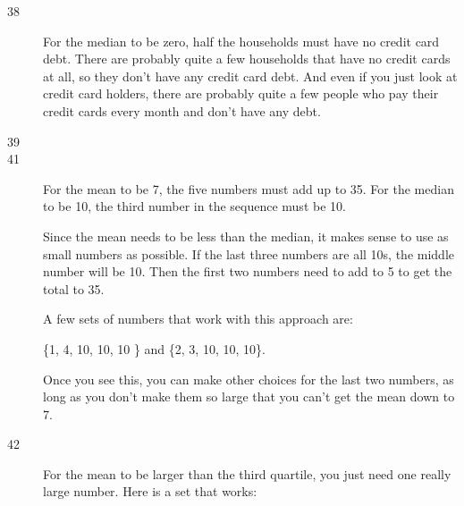 \documentclass{exam}
\begin{document}
\begin{description}
      \item[38]
        For the median to be zero, half the households must have no credit card
        debt.  There are probably quite a few households that have no credit
        cards at all, so they don't have any credit card debt.  And even if you
        just look at credit card holders, there are probably quite a few people
        who pay their credit cards every month and don't have any debt.

      \item[39]

      \item[41]
        For the mean to be 7, the five numbers must add up to 35.  For the
        median to be 10, the third number in the sequence must be 10.

        Since the mean needs to be less than the median, it makes sense to use
        as small numbers as possible.  If the last three numbers are all 10s,
        the middle number will be 10.  Then the first two numbers need to add
        to 5 to get the total to 35.

        A few sets of numbers that work with this approach are: 
        
        \{1, 4, 10, 10, 10 \} and \{2, 3, 10, 10, 10\}.

        Once you see this, you can make other choices for the last two numbers,
        as long as you don't make them so large that you can't get the mean
        down to 7.  

      \pagebreak

      \item[42]
        For the mean to be larger than the third quartile, you just need one
        really large number.  Here is a set that works: 
        

\end{description}
\end{document}
